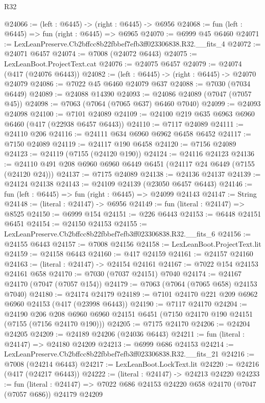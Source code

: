 \begin{lexlean}{R32}
\begin{coremodule}
@24066 := (left : @6445) -> (right : @6445) -> @6956
@24068 := fun (left : @6445) => fun (right : @6445) => @6965
@24070 := @6999 @45 @6460
@24071 := LexLeanPreserve.Cb2bffcc8b22fbbef7efb3ff023306838.R32.__fits_4
@24072 := @24071 @6457
@24074 := @7008 (@24072 @6443)
@24075 := LexLeanBoot.ProjectText.cat
@24076 := @24075 @6457
@24079 := @24074 (@417 (@24076 @6443))
@24082 := (left : @6445) -> (right : @6445) -> @24070 @24079
@24086 := @7022 @45 @6460 @24079 @637
@24088 := @7030 (@7034 @6449)
@24089 := @24088 @14390
@24093 := @24086 @24089 (@7047 (@7057 @45))
@24098 := @7063 (@7064 (@7065 @637) @6460 @7040)
@24099 := @24093 @24098
@24100 := @7101 @24089
@24109 := @24100 @219 @635 @6963 @6960 @6460 (@417 (@22938 @6457 @6443))
@24110 := @7117 @24089
@24111 := @24110 @206
@24116 := @24111 @634 @6960 @6962 @6458 @6452
@24117 := @7150 @24089
@24119 := @24117 @190 @6458
@24120 := @7156 @24089
@24123 := @24119 (@7155 (@24120 @190))
@24124 := @24116 @24123
@24136 := @24110 @491 @208 @6960 @6960 @6449 @6451 (@24117 @24 @6449 (@7155 (@24120 @24)))
@24137 := @7175 @24089
@24138 := @24136 @24137
@24139 := @24124 @24138
@24143 := @24109 @24139 (@23050 @6457 @6443)
@24146 := fun (left : @6445) => fun (right : @6445) => @24099 @24143
@24147 := String
@24148 := (literal : @24147) -> @6956
@24149 := fun (literal : @24147) => @8525
@24150 := @6999 @154
@24151 := @226 @6443
@24153 := @6448 @24151 @6451
@24154 := @24150 @24153
@24155 := LexLeanPreserve.Cb2bffcc8b22fbbef7efb3ff023306838.R32.__fits_6
@24156 := @24155 @6443
@24157 := @7008 @24156
@24158 := LexLeanBoot.ProjectText.lit
@24159 := @24158 @6443
@24160 := @417 @24159
@24161 := @24157 @24160
@24163 := (literal : @24147) -> @24154 @24161
@24167 := @7022 @154 @24153 @24161 @658
@24170 := @7030 (@7037 @24151) @7040
@24174 := @24167 @24170 (@7047 (@7057 @154))
@24179 := @7063 (@7064 (@7065 @658) @24153 @7040)
@24180 := @24174 @24179
@24189 := @7101 @24170 @221 @209 @6962 @6960 @24153 (@417 (@23998 @6443))
@24190 := @7117 @24170
@24204 := @24190
    @206
    @208
    @6960
    @6960
    @24151
    @6451
    (@7150 @24170 @190 @24151 (@7155 (@7156 @24170 @190)))
@24205 := @7175 @24170
@24206 := @24204 @24205
@24209 := @24189 @24206 (@24036 @6443)
@24211 := fun (literal : @24147) => @24180 @24209
@24213 := @6999 @686 @24153
@24214 := LexLeanPreserve.Cb2bffcc8b22fbbef7efb3ff023306838.R32.__fits_21
@24216 := @7008 (@24214 @6443)
@24217 := LexLeanBoot.LockText.lit
@24220 := @24216 (@417 (@24217 @6443))
@24222 := (literal : @24147) -> @24213 @24220
@24233 := fun (literal : @24147) =>
  @7022 @686 @24153 @24220 @658 @24170 (@7047 (@7057 @686)) @24179 @24209

\end{coremodule}
\end{lexlean}
